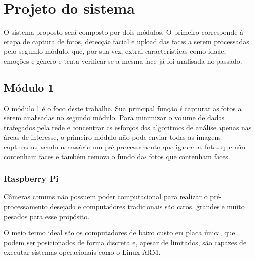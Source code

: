 \chapter{Projeto do sistema}\label{cap:projeto}

O sistema proposto será composto por dois módulos.
O primeiro corresponde à etapa de captura de fotos, detecção facial e upload das faces a serem processadas pelo segundo módulo, que, por sua vez, extrai características como idade, emoções e gênero e tenta verificar se a mesma face já foi analisada no passado.

\section{Módulo 1}\label{sec:modulo1}

O módulo 1 é o foco deste trabalho. Sua principal função é capturar as fotos a serem analisadas no segundo módulo.
Para minimizar o volume de dados trafegados pela rede e concentrar os esforços dos algoritmos de análise apenas nas áreas de interesse, o primeiro módulo não pode enviar todas as imagens capturadas, sendo necessário um pré-processamento que ignore as fotos que não contenham faces e também remova o fundo das fotos que contenham faces.

\subsection{Raspberry Pi}

Câmeras comuns não possuem poder computacional para realizar o pré-processamento desejado e computadores tradicionais são caros, grandes e muito pesados para esse propósito.

O meio termo ideal são os computadores de baixo custo em placa única, que podem ser posicionados de forma discreta e, apesar de limitados, são capazes de executar sistemas operacionais como o Linux ARM.


